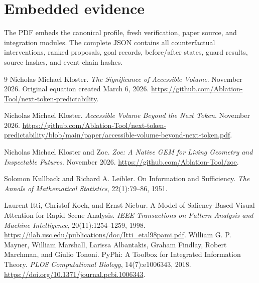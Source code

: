 \documentclass[11pt,a4paper]{article}
\begin{document}

\section{Embedded evidence}
The PDF embeds the canonical profile, fresh verification, paper source, and integration modules. The complete JSON contains all counterfactual interventions, ranked proposals, goal records, before/after states, guard results, source hashes, and event-chain hashes.


\begin{thebibliography}{9}
Nicholas Michael Kloster.
\newblock \emph{The Significance of Accessible Volume}.
\newblock November 2026. Original equation created March 6, 2026.
\newblock \url{https://github.com/Ablation-Tool/next-token-predictability}.

Nicholas Michael Kloster.
\newblock \emph{Accessible Volume Beyond the Next Token}.
\newblock November 2026.
\newblock \url{https://github.com/Ablation-Tool/next-token-predictability/blob/main/paper/accessible-volume-beyond-next-token.pdf}.

Nicholas Michael Kloster and Zoe.
\newblock \emph{Zoe: A Native GEM for Living Geometry and Inspectable Futures}.
\newblock November 2026.
\newblock \url{https://github.com/Ablation-Tool/zoe}.

Solomon Kullback and Richard A. Leibler.
\newblock On Information and Sufficiency.
\newblock \emph{The Annals of Mathematical Statistics}, 22(1):79--86, 1951.

Laurent Itti, Christof Koch, and Ernst Niebur.
\newblock A Model of Saliency-Based Visual Attention for Rapid Scene Analysis.
\newblock \emph{IEEE Transactions on Pattern Analysis and Machine Intelligence}, 20(11):1254--1259, 1998.
\newblock \url{https://ilab.usc.edu/publications/doc/Itti_etal98pami.pdf}.
William G. P. Mayner, William Marshall, Larissa Albantakis, Graham Findlay, Robert Marchman, and Giulio Tononi.
\newblock PyPhi: A Toolbox for Integrated Information Theory.
\newblock \emph{PLOS Computational Biology}, 14(7):e1006343, 2018.
\newblock \url{https://doi.org/10.1371/journal.pcbi.1006343}.
\end{thebibliography}
\end{document}
